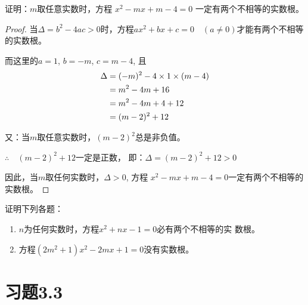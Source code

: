 \begin{example}
    证明：$m$取任意实数时，方程
$x^2-mx+m-4=0$
一定有两个不相等的实数根。
\end{example}

\begin{proof}
 当$\Delta =b^2-4ac>0$时，方程$ax^2+bx+c=0\quad (a\ne 0)$才能有两个不相等的实数根。

而这里的$a=1$, $b=-m$, $c=m-4$, 
且
\[\begin{split}
    \Delta &=(-m)^2-4\times1\times(m-4)\\
&=m^2-4m+16\\
&=m^2-4m+4+12\\
&=(m-2)^2+12\\
\end{split}\]

又：当$m$取任意实数时，$(m-2)^2$总是非负值。

$\therefore\quad (m-2)^2+12$一定是正数，
即：$\Delta =(m-2)^2+12>0$

因此，当$m$取任何实数时，$\Delta >0$, 方程   
$x^2-mx+m-4=0$一定有两个不相等的实数根。
\end{proof}


\begin{ex}
    证明下列各题：
\begin{enumerate}
    \item $n$为任何实数时，方程$x^2+nx-1=0$必有两个不相等的实
    数根。
    \item 方程$(2m^2+1)x^2-2mx+1=0$没有实数根。
\end{enumerate}
\end{ex}

\section*{习题3.3}


